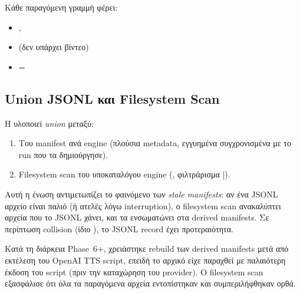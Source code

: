 Κάθε παραγόμενη γραμμή φέρει:
\begin{itemize}
  \item {}, 
  \item {} (δεν υπάρχει βίντεο)
  \item {} = 
\end{itemize}

\subsection*{Union JSONL και Filesystem Scan}

Η  υλοποιεί \emph{union} μεταξύ:
\begin{enumerate}
  \item Του  manifest ανά engine (πλούσια metadata,
    εγγυημένα συγχρονισμένα με το run που τα δημιούργησε).
  \item Filesystem scan του υποκαταλόγου engine
    (, φιλτράρισμα |).
\end{enumerate}

Αυτή η ένωση αντιμετωπίζει το φαινόμενο των \emph{stale manifests}:
αν ένα JSONL αρχείο είναι παλιό (ή ατελές λόγω interruption),
ο filesystem scan ανακαλύπτει αρχεία που το JSONL χάνει,
και τα ενσωματώνει στα derived manifests.
Σε περίπτωση collision (ίδιο ),
το JSONL record έχει προτεραιότητα.

Κατά τη διάρκεια Phase~6+, χρειάστηκε rebuild των derived manifests
μετά από εκτέλεση του OpenAI TTS script, επειδή το αρχικό
 είχε παραχθεί με παλαιότερη
έκδοση του script (πριν την καταχώρηση του provider).
Ο filesystem scan εξασφάλισε ότι όλα τα παραγόμενα 
αρχεία εντοπίστηκαν και συμπεριλήφθηκαν ορθά.

